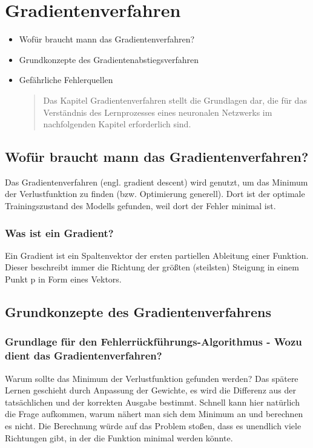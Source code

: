 \newpage
\thispagestyle{empty}
\section{Gradientenverfahren}\label{sec:gradientenverfahren}   
\begin{tcolorbox}[title={Inhalte des \textit{Gradientenverfahren}}]
  \begin{itemize}
    \item Wofür braucht mann das Gradientenverfahren?
    \item Grundkonzepte des Gradientenabstiegsverfahren
    \item Gefährliche Fehlerquellen
  \begin{quotation}\noindent
      Das Kapitel Gradientenverfahren stellt die Grundlagen dar, die für das Verständnis des Lernprozesses eines neuronalen Netzwerks im nachfolgenden Kapitel erforderlich sind.
  \end{quotation}
  \end{itemize}
\end{tcolorbox}


\subsection{Wofür braucht mann das Gradientenverfahren?}\label{subsec:gradientenverfahren:wofuer}
Das Gradientenverfahren (engl. gradient descent) wird genutzt, um das Minimum der Verlustfunktion zu finden (bzw. Optimierung generell). Dort ist der optimale Trainingszustand des Modells gefunden, weil dort der Fehler minimal ist.


\subsubsection{Was ist ein Gradient?}\label{subsec:gradientenverfahren:was_ist_gradient}
  Ein Gradient ist ein Spaltenvektor der ersten partiellen Ableitung einer Funktion. 
  Dieser beschreibt immer die Richtung der größten (steilsten) Steigung in einem Punkt p in Form eines Vektors.\cite{JH20}



\subsection{Grundkonzepte des Gradientenverfahrens}\label{subsec:gradientenverfahren:grundkonzepte}
\subsubsection{Grundlage für den Fehlerrückführungs-Algorithmus - Wozu dient das Gradientenverfahren?}\label{subsec:gradientenverfahren:grundlage_fehlerrueckfuehrungsalg}
  Warum sollte das Minimum der Verlustfunktion gefunden werden? Das spätere Lernen geschieht durch Anpassung der Gewichte, es wird die Differenz aus der tatsächlichen und der korrekten Ausgabe bestimmt. 
  Schnell kann hier natürlich die Frage aufkommen, warum nähert man sich dem Minimum an und berechnen es nicht. Die Berechnung würde auf das Problem stoßen, dass es unendlich viele Richtungen gibt, in der die Funktion minimal werden könnte. 

